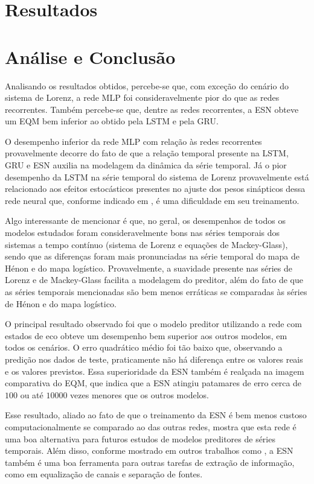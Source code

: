 \documentclass[a4paper, 12pt]{article}
\begin{document}
\section{Resultados}

\section{Análise e Conclusão}

Analisando os resultados obtidos, percebe-se que, com exceção do cenário do sistema de Lorenz, a rede MLP foi consideravelmente pior do que as redes recorrentes. Também percebe-se que, dentre as redes recorrentes, a ESN obteve um EQM bem inferior ao obtido pela LSTM e pela GRU.

O desempenho inferior da rede MLP com relação às redes recorrentes provavelmente decorre do fato de que a relação temporal presente na LSTM, GRU e ESN auxilia na modelagem da dinâmica da série temporal. Já o pior desempenho da LSTM na série temporal do sistema de Lorenz provavelmente está relacionado aos efeitos estocásticos presentes no ajuste dos pesos sinápticos dessa rede neural que, conforme indicado em \cite{doya1992bifurcations}, é uma dificuldade em seu treinamento.

Algo interessante de mencionar é que, no geral, os desempenhos de todos os modelos estudados foram consideravelmente bons nas séries temporais dos sistemas a tempo contínuo (sistema de Lorenz e equações de Mackey-Glass), sendo que as diferenças foram mais pronunciadas na série temporal do mapa de Hénon e do mapa logístico. Provavelmente, a suavidade presente nas séries de Lorenz e de Mackey-Glass facilita a modelagem do preditor, além do fato de que as séries temporais mencionadas são bem menos erráticas se comparadas às séries de Hénon e do mapa logístico.

O principal resultado observado foi que o modelo preditor utilizando a rede com estados de eco obteve um desempenho bem superior aos outros modelos, em todos os cenários. O erro quadrático médio foi tão baixo que, observando a predição nos dados de teste, praticamente não há diferença entre os valores reais e os valores previstos. Essa superioridade da ESN também é realçada na imagem  comparativa do EQM, que indica que a ESN  atingiu patamares de erro cerca de $100$ ou até $10000$ vezes menores que os outros modelos. 

Esse resultado, aliado ao fato de que o treinamento da ESN é bem menos custoso computacionalmente se comparado ao das outras redes, mostra que esta rede é uma boa alternativa para futuros estudos de modelos preditores de séries temporais. Além disso, conforme mostrado em outros trabalhos como \cite{jaeger2004harnessing, jaeger2007echo, boccato2013novas}, a ESN também é uma boa ferramenta para outras tarefas de extração de informação, como em equalização de canais e separação de fontes. 
\end{document}
